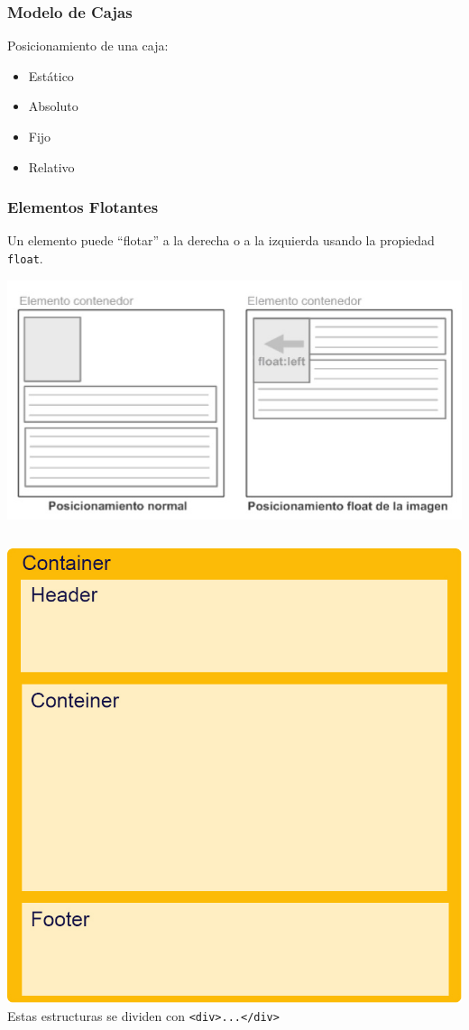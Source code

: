 \documentclass{beamer}
\begin{document}
\begin{frame} %
\frametitle{Modelo de Cajas}
	Posicionamiento de una caja:
	\begin{itemize}
	\item Estático
	\item Absoluto
	\item Fijo
	\item Relativo
	\end{itemize}
\end{frame}

\begin{frame} %
\frametitle{Elementos Flotantes}
	Un elemento puede ``flotar'' a la derecha o a la izquierda usando la propiedad {\tt float}.
	\begin{center}
	\includegraphics[scale=.5]{images/Floats.jpg} 
	\end{center}
\end{frame}

\begin{frame} %
	\begin{columns}[c]
	\includegraphics[scale=.22]{images/PruebaEstructura.jpg} 
	\pause
	Estas estructuras se dividen con {\tt <div>...</div>}
	\end{columns}
\end{frame}
\end{document}
